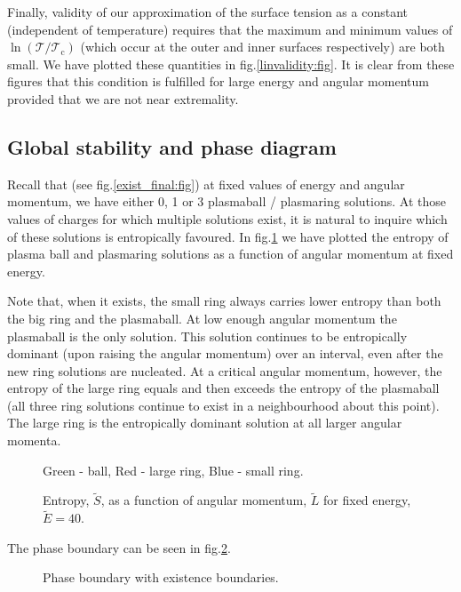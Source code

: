 \documentclass[12pt,a4paper]{article}
\newcommand{\tE}{\widetilde{E}}
\newcommand{\tL}{\widetilde{L}}
\newcommand{\tS}{\widetilde{S}}
\newcommand{\tc}{\mathcal{T_\mathrm{c}}}
\newcommand{\tloc}{\mathcal{T}}
\begin{document}
Finally,  validity of our approximation of the surface tension as
a constant (independent of temperature) requires that the maximum
and minimum values of $\ln(\tloc/\tc)$ (which occur at the outer and
inner surfaces respectively) are both small. We have plotted these
quantities in fig.\ref{linvalidity:fig}. It is clear from these
figures that this condition is fulfilled for large energy and
angular momentum provided that we are not near extremality.




\subsection{Global stability and phase diagram}\label{sec:globstab}

Recall that (see fig.\ref{exist_final:fig}) at fixed values of
energy and angular momentum, we have either 0, 1 or 3 plasmaball /
plasmaring solutions. At those values of charges for which multiple
solutions exist, it is natural to inquire which of these solutions
is entropically favoured. In fig.\ref{ent:fig} we have plotted the
entropy of plasma ball and plasmaring solutions as a function of
angular momentum at fixed energy.

Note that, when it exists, the small ring always carries lower
entropy than both the big ring and the plasmaball. At low enough
angular momentum the plasmaball is the only solution. This solution
continues to be entropically dominant (upon raising the angular
momentum) over an interval, even after the new ring solutions are
nucleated. At a critical angular momentum, however, the entropy of
the large ring equals and then exceeds the entropy of the plasmaball
(all three ring solutions continue to exist in a neighbourhood about
this point). The large ring is the entropically dominant solution at
all larger angular momenta.


\begin{figure}
%
 \begin{center}
  \small{Green - ball, Red - large ring, Blue - small ring.} \\
  
 \caption{Entropy, $\tS$, as a function of angular momentum, $\tL$
for fixed energy, $\tE=40$.}\label{ent:fig}
 \end{center}
\end{figure}


The phase boundary can be seen in fig.\ref{phase:fig}.


\begin{figure}
%
 \begin{center}
   
 \caption{Phase boundary with existence boundaries.}\label{phase:fig}
 \end{center}
\end{figure}
\end{document}
